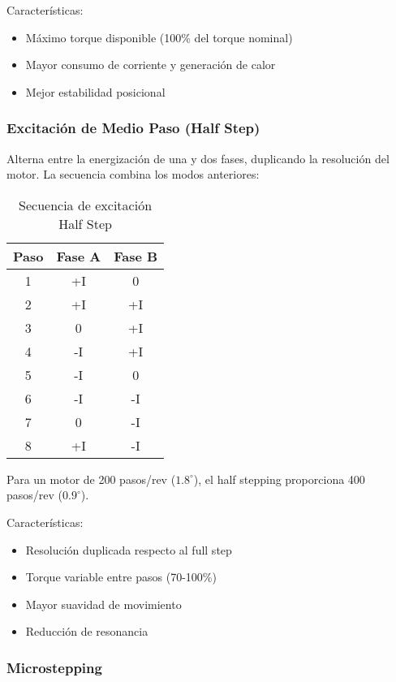 Características:
\begin{itemize}
    \item Máximo torque disponible (100\% del torque nominal)
    \item Mayor consumo de corriente y generación de calor
    \item Mejor estabilidad posicional
\end{itemize}

\subsubsection{Excitación de Medio Paso (Half Step)}

Alterna entre la energización de una y dos fases, duplicando la resolución del motor. La secuencia combina los modos anteriores:

\begin{table}[ht]
\centering
\caption{Secuencia de excitación Half Step}
\begin{tabular}{|c|c|c|}
\hline
\textbf{Paso} & \textbf{Fase A} & \textbf{Fase B} \\
\hline
1 & +I & 0 \\
2 & +I & +I \\
3 & 0 & +I \\
4 & -I & +I \\
5 & -I & 0 \\
6 & -I & -I \\
7 & 0 & -I \\
8 & +I & -I \\
\hline
\end{tabular}
\end{table}

Para un motor de 200 pasos/rev ($1.8^\circ$), el half stepping proporciona 400 pasos/rev ($0.9^\circ$).

Características:
\begin{itemize}
    \item Resolución duplicada respecto al full step
    \item Torque variable entre pasos (70-100\%)
    \item Mayor suavidad de movimiento
    \item Reducción de resonancia
\end{itemize}

\subsubsection{Microstepping}

